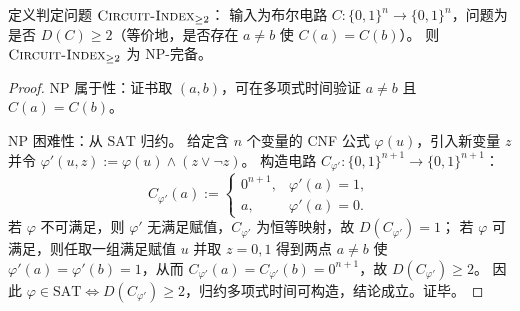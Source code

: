 \begin{theorem}\label{thm:circuit-noninjective-np-complete}
定义判定问题 \(\text{\normalfont\textsc{Circuit-Index}}_{\ge 2}\)：
输入为布尔电路 \(C:\{0,1\}^n\to\{0,1\}^n\)，问题为是否 \(D(C)\ge 2\)（等价地，是否存在 \(a\neq b\) 使 \(C(a)=C(b)\)）。
则 \(\text{\normalfont\textsc{Circuit-Index}}_{\ge 2}\) 为 \(\mathrm{NP}\)-完备。
\end{theorem}

\begin{proof}
\(\mathrm{NP}\) 属于性：证书取 \((a,b)\)，可在多项式时间验证 \(a\neq b\) 且 \(C(a)=C(b)\)。
\par
\(\mathrm{NP}\) 困难性：从 \(\mathrm{SAT}\) 归约。
给定含 \(n\) 个变量的 CNF 公式 \(\varphi(u)\)，引入新变量 \(z\) 并令 \(\varphi'(u,z):=\varphi(u)\wedge (z\vee\neg z)\)。
构造电路 \(C_{\varphi'}:\{0,1\}^{n+1}\to\{0,1\}^{n+1}\)：
\[
C_{\varphi'}(a):=
\begin{cases}
0^{n+1}, & \varphi'(a)=1,\\
a, & \varphi'(a)=0.
\end{cases}
\]
若 \(\varphi\) 不可满足，则 \(\varphi'\) 无满足赋值，\(C_{\varphi'}\) 为恒等映射，故 \(D(C_{\varphi'})=1\)；
若 \(\varphi\) 可满足，则任取一组满足赋值 \(u\) 并取 \(z=0,1\) 得到两点 \(a\neq b\) 使 \(\varphi'(a)=\varphi'(b)=1\)，从而 \(C_{\varphi'}(a)=C_{\varphi'}(b)=0^{n+1}\)，故 \(D(C_{\varphi'})\ge 2\)。
因此 \(\varphi\in\mathrm{SAT}\iff D(C_{\varphi'})\ge 2\)，归约多项式时间可构造，结论成立。证毕。
\end{proof}

